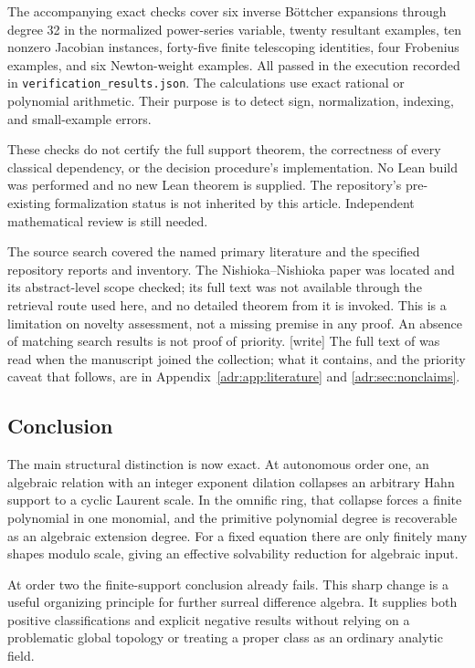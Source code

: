 \documentclass[11pt,letterpaper]{article}
\numberwithin{equation}{section}
\theoremstyle{definition}
\theoremstyle{remark}
\newcommand{\wtag}{\textup{[write]}}%
\begin{document}
The accompanying exact checks cover six inverse B\"ottcher expansions
through degree 32 in the normalized power-series variable, twenty
resultant examples, ten nonzero Jacobian instances, forty-five finite
telescoping identities, four Frobenius examples, and six Newton-weight
examples. All passed in the execution recorded in
\texttt{verification\_results.json}. The calculations use exact rational
or polynomial arithmetic. Their purpose is to detect sign, normalization,
indexing, and small-example errors.

These checks do not certify the full support theorem, the correctness
of every classical dependency, or the decision procedure's implementation.
No Lean build was performed and no new Lean theorem is supplied. The
repository's pre-existing formalization status is not inherited by this
article. Independent mathematical review is still needed.

The source search covered the named primary literature and the specified
repository reports and inventory. The Nishioka--Nishioka paper was located
and its abstract-level scope checked; its full text was not available
through the retrieval route used here, and no detailed theorem from it
is invoked. This is a limitation on novelty assessment, not a missing
premise in any proof. An absence of matching search results is not proof
of priority.
\wtag{} The full text of \cite{NN} was read when the manuscript joined the
collection; what it contains, and the priority caveat that follows, are in
Appendix~\ref{adr:app:literature} and \cref{adr:sec:nonclaims}.

\subsection{Conclusion}

The main structural distinction is now exact. At autonomous order one,
an algebraic relation with an integer exponent dilation collapses an
arbitrary Hahn support to a cyclic Laurent scale. In the omnific ring,
that collapse forces a finite polynomial in one monomial, and the
primitive polynomial degree is recoverable as an algebraic extension
degree. For a fixed equation there are only finitely many shapes modulo
scale, giving an effective solvability reduction for algebraic input.

At order two the finite-support conclusion already fails. This sharp
change is a useful organizing principle for further surreal difference
algebra. It supplies both positive classifications and explicit negative
results without relying on a problematic global topology or treating a
proper class as an ordinary analytic field.
\end{document}
